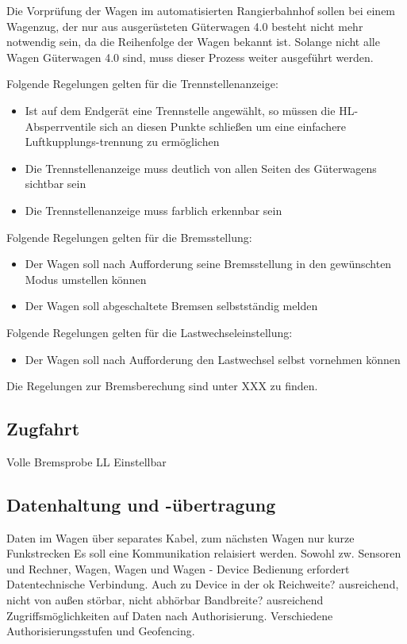 Die Vorprüfung der Wagen im automatisierten Rangierbahnhof sollen bei einem Wagenzug, der nur aus ausgerüsteten Güterwagen 4.0 besteht nicht mehr notwendig sein, da die Reihenfolge der Wagen bekannt ist. Solange nicht alle Wagen Güterwagen 4.0 sind, muss dieser Prozess weiter ausgeführt werden.\par
Folgende Regelungen gelten für die Trennstellenanzeige:
\begin{itemize}
    \item Ist auf dem Endgerät eine Trennstelle angewählt, so müssen die HL-Absperrventile sich an diesen Punkte schließen um eine einfachere Luftkupplungs-trennung zu ermöglichen
    \item Die Trennstellenanzeige muss deutlich von allen Seiten des Güterwagens sichtbar sein
    \item Die Trennstellenanzeige muss farblich erkennbar sein
\end{itemize}
Folgende Regelungen gelten für die Bremsstellung:
\begin{itemize}
    \item Der Wagen soll nach Aufforderung seine Bremsstellung in den gewünschten Modus umstellen können
    \item Der Wagen soll abgeschaltete Bremsen selbstständig melden
\end{itemize}
Folgende Regelungen gelten für die Lastwechseleinstellung:
\begin{itemize}
    \item Der Wagen soll nach Aufforderung den Lastwechsel selbst vornehmen können
\end{itemize}
Die Regelungen zur Bremsberechung sind unter XXX zu finden.

\subsection{Zugfahrt}
Volle Bremsprobe
LL Einstellbar

\subsection{Datenhaltung und -übertragung}
Daten im Wagen über separates Kabel, zum nächsten Wagen nur kurze Funkstrecken
Es soll eine Kommunikation relaisiert werden. Sowohl zw. Sensoren und Rechner, Wagen, Wagen und Wagen - Device
Bedienung erfordert Datentechnische Verbindung. Auch zu Device in der ok
Reichweite? ausreichend, nicht von außen störbar, nicht abhörbar
Bandbreite? ausreichend
Zugriffsmöglichkeiten auf Daten nach Authorisierung. Verschiedene Authorisierungsstufen und Geofencing.
